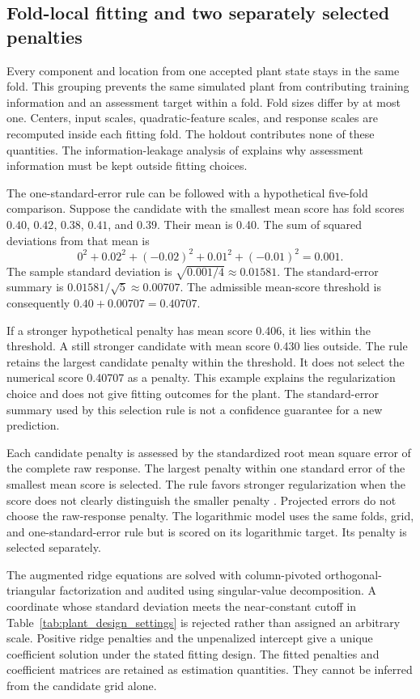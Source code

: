 \subsection{Fold-local fitting and two separately selected penalties}

Every component and location from one accepted plant state stays in the same fold. This grouping prevents the same simulated plant from contributing training information and an assessment target within a fold. Fold sizes differ by at most one. Centers, input scales, quadratic-feature scales, and response scales are recomputed inside each fitting fold. The holdout contributes none of these quantities. The information-leakage analysis of \citet{Kaufman2012} explains why assessment information must be kept outside fitting choices.

The one-standard-error rule can be followed with a hypothetical five-fold comparison. Suppose the candidate with the smallest mean score has fold scores $0.40$, $0.42$, $0.38$, $0.41$, and $0.39$. Their mean is 0.40. The sum of squared deviations from that mean is
\[
0^2+0.02^2+(-0.02)^2+0.01^2+(-0.01)^2=0.001.
\]
The sample standard deviation is $\sqrt{0.001/4}\approx0.01581$. The standard-error summary is $0.01581/\sqrt5\approx0.00707$. The admissible mean-score threshold is consequently $0.40+0.00707=0.40707$.

If a stronger hypothetical penalty has mean score 0.406, it lies within the threshold. A still stronger candidate with mean score 0.430 lies outside. The rule retains the largest candidate penalty within the threshold. It does not select the numerical score 0.40707 as a penalty. This example explains the regularization choice and does not give fitting outcomes for the plant. The standard-error summary used by this selection rule is not a confidence guarantee for a new prediction.

Each candidate penalty is assessed by the standardized root mean square error of the complete raw response. The largest penalty within one standard error of the smallest mean score is selected. The rule favors stronger regularization when the score does not clearly distinguish the smaller penalty \citep{Hastie2009}. Projected errors do not choose the raw-response penalty. The logarithmic model uses the same folds, grid, and one-standard-error rule but is scored on its logarithmic target. Its penalty is selected separately.

The augmented ridge equations are solved with column-pivoted orthogonal-triangular factorization and audited using singular-value decomposition. A coordinate whose standard deviation meets the near-constant cutoff in Table~\ref{tab:plant_design_settings} is rejected rather than assigned an arbitrary scale. Positive ridge penalties and the unpenalized intercept give a unique coefficient solution under the stated fitting design. The fitted penalties and coefficient matrices are retained as estimation quantities. They cannot be inferred from the candidate grid alone.


